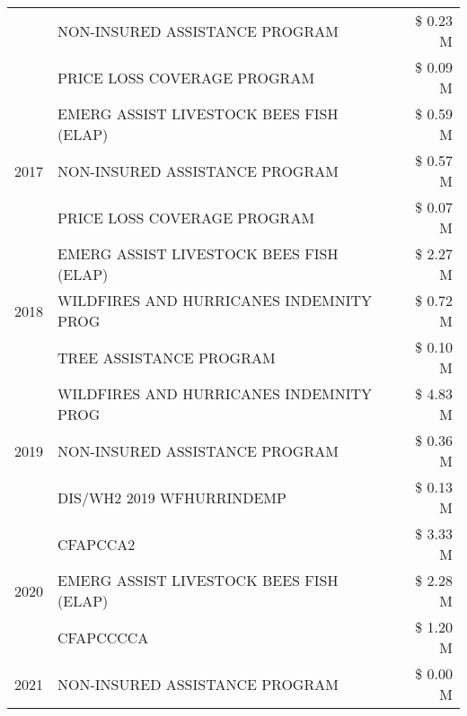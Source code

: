 \begin{tabular}{llr}
 & NON-INSURED ASSISTANCE PROGRAM                & \$ 0.23 M \\
 & PRICE LOSS COVERAGE PROGRAM                   & \$ 0.09 M \\
\cline{1-3}
\multirow[t]{3}{*}{2017} & EMERG ASSIST LIVESTOCK BEES FISH (ELAP) & \$ 0.59 M \\
 & NON-INSURED ASSISTANCE PROGRAM & \$ 0.57 M \\
 & PRICE LOSS COVERAGE PROGRAM & \$ 0.07 M \\
\cline{1-3}
\multirow[t]{3}{*}{2018} & EMERG ASSIST LIVESTOCK BEES FISH (ELAP) & \$ 2.27 M \\
 & WILDFIRES AND HURRICANES INDEMNITY PROG & \$ 0.72 M \\
 & TREE ASSISTANCE PROGRAM & \$ 0.10 M \\
\cline{1-3}
\multirow[t]{3}{*}{2019} & WILDFIRES AND HURRICANES INDEMNITY PROG & \$ 4.83 M \\
 & NON-INSURED ASSISTANCE PROGRAM & \$ 0.36 M \\
 & DIS/WH2 2019 WFHURRINDEMP & \$ 0.13 M \\
\cline{1-3}
\multirow[t]{3}{*}{2020} & CFAPCCA2 & \$ 3.33 M \\
 & EMERG ASSIST LIVESTOCK BEES FISH (ELAP) & \$ 2.28 M \\
 & CFAPCCCCA & \$ 1.20 M \\
\cline{1-3}
2021 & NON-INSURED ASSISTANCE PROGRAM & \$ 0.00 M \\
\cline{1-3}
\bottomrule
\end{tabular}
